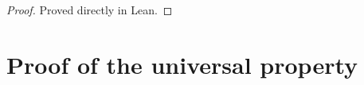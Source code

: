 \begin{proof} Proved directly in Lean. \end{proof}

\section{Proof of the universal property}
\label{sec:albaneseup_proof}

